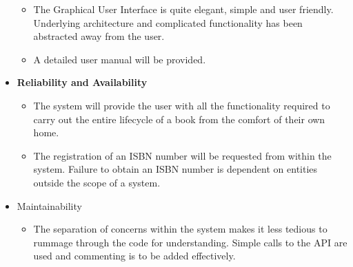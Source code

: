 \begin{itemize}
\begin{itemize}
		\item The Graphical User Interface is quite elegant, simple and user friendly. Underlying architecture and complicated functionality has been abstracted away from the user.
		\item A detailed user manual will be provided.
	\end{itemize}
	\item \textbf{Reliability and Availability}
	\begin{itemize}
		\item The system will provide the user with all the functionality required to carry out the entire lifecycle of a book from the comfort of their own home.
		\item The registration of an ISBN number will be requested from within the system. Failure to obtain an ISBN number is dependent on entities outside the scope of a system.
	\end{itemize}
	\item{Maintainability}
	\begin{itemize}
		\item The separation of concerns within the system makes it less tedious to rummage through the code for understanding. Simple calls to the API are used and commenting is to be added effectively.
	\end{itemize}
\end{itemize}


%
